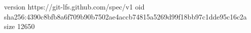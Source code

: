 version https://git-lfs.github.com/spec/v1
oid sha256:4390c8bfb8a6f709b90b7502ae4accb74815a5269d99f18bb97c1dde95c16c2a
size 12650

